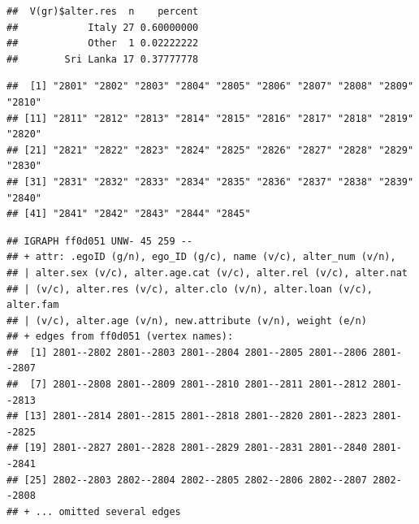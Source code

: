 \documentclass[
]{book}
\newenvironment{Shaded}{\begin{snugshade}}{\end{snugshade}}
\newcommand{\CommentTok}[1]{\textcolor[rgb]{0.56,0.35,0.01}{\textit{#1}}}
\newcommand{\DecValTok}[1]{\textcolor[rgb]{0.00,0.00,0.81}{#1}}
\newcommand{\FunctionTok}[1]{\textcolor[rgb]{0.13,0.29,0.53}{\textbf{#1}}}
\newcommand{\NormalTok}[1]{#1}
\newcommand{\OtherTok}[1]{\textcolor[rgb]{0.56,0.35,0.01}{#1}}
\newcommand{\SpecialCharTok}[1]{\textcolor[rgb]{0.81,0.36,0.00}{\textbf{#1}}}
\begin{document}
\begin{Shaded}
\end{Shaded}

\begin{verbatim}
##  V(gr)$alter.res  n    percent
##            Italy 27 0.60000000
##            Other  1 0.02222222
##        Sri Lanka 17 0.37777778
\end{verbatim}

\begin{Shaded}
\end{Shaded}

\begin{verbatim}
##  [1] "2801" "2802" "2803" "2804" "2805" "2806" "2807" "2808" "2809" "2810"
## [11] "2811" "2812" "2813" "2814" "2815" "2816" "2817" "2818" "2819" "2820"
## [21] "2821" "2822" "2823" "2824" "2825" "2826" "2827" "2828" "2829" "2830"
## [31] "2831" "2832" "2833" "2834" "2835" "2836" "2837" "2838" "2839" "2840"
## [41] "2841" "2842" "2843" "2844" "2845"
\end{verbatim}

\begin{Shaded}
\end{Shaded}

\begin{verbatim}
## IGRAPH ff0d051 UNW- 45 259 -- 
## + attr: .egoID (g/n), ego_ID (g/c), name (v/c), alter_num (v/n),
## | alter.sex (v/c), alter.age.cat (v/c), alter.rel (v/c), alter.nat
## | (v/c), alter.res (v/c), alter.clo (v/n), alter.loan (v/c), alter.fam
## | (v/c), alter.age (v/n), new.attribute (v/n), weight (e/n)
## + edges from ff0d051 (vertex names):
##  [1] 2801--2802 2801--2803 2801--2804 2801--2805 2801--2806 2801--2807
##  [7] 2801--2808 2801--2809 2801--2810 2801--2811 2801--2812 2801--2813
## [13] 2801--2814 2801--2815 2801--2818 2801--2820 2801--2823 2801--2825
## [19] 2801--2827 2801--2828 2801--2829 2801--2831 2801--2840 2801--2841
## [25] 2802--2803 2802--2804 2802--2805 2802--2806 2802--2807 2802--2808
## + ... omitted several edges
\end{verbatim}
\end{document}
